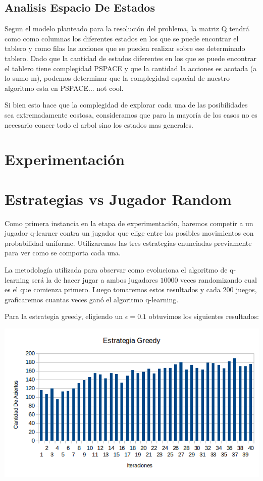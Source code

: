 
\subsection{Analisis Espacio De Estados}

Segun el modelo planteado para la resolución del problema, la matriz Q tendrá como como columnas los diferentes estados en los que se puede encontrar el tablero y como filas las acciones que se pueden realizar sobre ese determinado tablero. Dado que la cantidad de estados diferentes en los que se puede encontrar el tablero tiene complegidad PSPACE y que la cantidad la acciones es acotada (a lo sumo m), podemos determinar que la complegidad espacial de nuestro algoritmo esta en PSPACE... not cool.

Si bien esto hace que la complegidad de explorar cada una de las posibilidades sea extremadamente costosa, consideramos que para la mayoría de los casos no es necesario concer todo el arbol sino los estados mas generales.



\pagebreak
\section{Experimentación}

\section{Estrategias vs Jugador Random}

Como primera instancia en la etapa de experimentación, haremos competir a un jugador q-learner contra un jugador que elige entre los posibles movimientos con probabilidad uniforme. Utilizaremos las tres estrategias enunciadas previamente para ver como se comporta cada una. 

La metodología utilizada para observar como evoluciona el algoritmo de q-learning será la de hacer jugar a ambos jugadores $10000$ veces randomizando cual es el que comienza primero. Luego tomaremos estos resultados y cada $200$ juegos, graficaremos cuantas veces ganó el algoritmo q-learning. 

Para la estrategia greedy, eligiendo un $\epsilon=0.1$ obtuvimos los siguientes resultados:

\includegraphics[scale=0.5]{testing/greedy.png}

